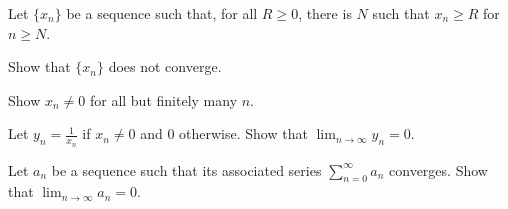 \documentclass[../notes.tex]{subfiles}
\begin{document}
\begin{homework}
    Let $\{x_n\}$ be a sequence such that, for all $R\geq 0$, there is $N$ such that $x_n \geq R$ for $n\geq N$.
    \begin{listalph}
        \item Show that $\{x_n\}$ does not converge. 
        \item Show $x_n\neq0$ for all but finitely many $n$.  
        \item Let $y_n=\frac{1}{x_n}$ if $x_n\neq 0$ and $0$ otherwise. Show that $\lim_{n\to\infty }y_n=0$. 
    \end{listalph}
\end{homework}
\begin{homework}
    Let $a_n$ be a sequence such that its associated series $\sum_{n=0}^\infty a_n$ converges. Show that $\lim_{n\to \infty}a_n =0$. 
\end{homework}
\end{document}

